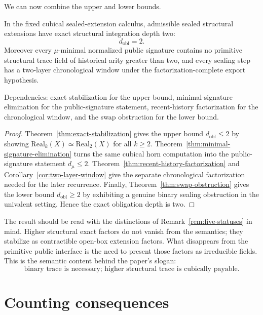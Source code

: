 \documentclass{lmcs}
\begin{document}
We can now combine the upper and lower bounds.

\begin{cor}
\label{cor:exact-depth-two}
In the fixed cubical sealed-extension calculus, admissible sealed structural extensions have
exact structural integration depth two:
\[
  d_{\mathrm{obl}}=2.
\]
Moreover every \(\mu\)-minimal normalized public signature contains no primitive structural
trace field of historical arity greater than two, and every sealing step has a two-layer
chronological window under the factorization-complete export hypothesis.

Dependencies: exact stabilization for the upper bound, minimal-signature elimination for
the public-signature statement, recent-history factorization for the chronological window,
and the swap obstruction for the lower bound.
\end{cor}

\begin{proof}
Theorem~\ref{thm:exact-stabilization} gives the upper bound
\(d_{\mathrm{obl}}\leq 2\) by showing
\(\mathrm{Real}_k(X)\simeq\mathrm{Real}_2(X)\) for all \(k\geq 2\).  Theorem~\ref{thm:minimal-signature-elimination}
turns the same cubical horn computation into the public-signature statement
\(d_\mu\leq 2\).  Theorem~\ref{thm:recent-history-factorization} and
Corollary~\ref{cor:two-layer-window} give the separate chronological factorization needed
for the later recurrence.  Finally, Theorem~\ref{thm:swap-obstruction} gives the lower bound
\(d_{\mathrm{obl}}\geq 2\) by exhibiting a genuine binary sealing obstruction in the univalent
setting.  Hence the exact obligation depth is two.
\end{proof}

The result should be read with the distinctions of Remark~\ref{rem:five-statuses} in mind.
Higher structural exact factors do not vanish from the semantics; they stabilize as
contractible open-box extension factors.  What disappears from the primitive public
interface is the need to present those factors as irreducible fields.  This is the semantic
content behind the paper's slogan:
\[
  \text{binary trace is necessary; higher structural trace is cubically payable.}
\]

\section{Counting consequences}
\label{sec:scaling}
\end{document}
